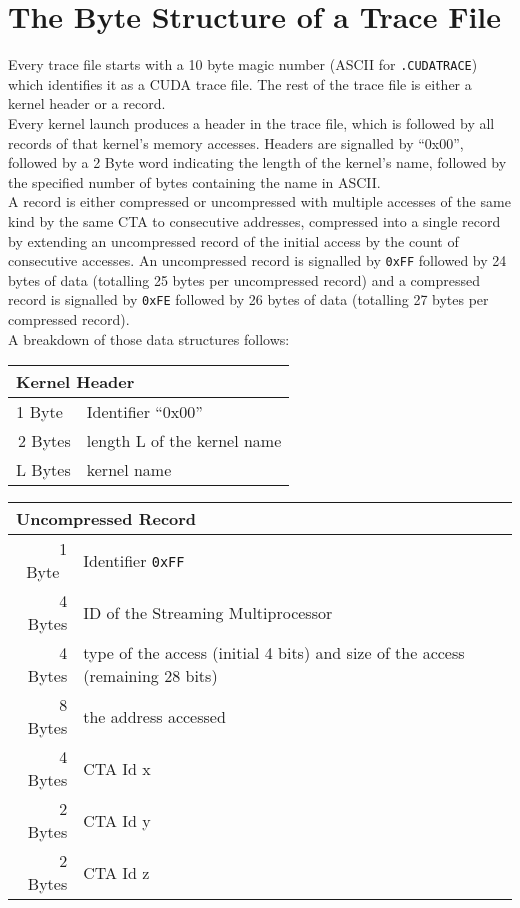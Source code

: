 \documentclass{scrartcl}
\begin{document}
\newpage

\section{The Byte Structure of a Trace File}
Every trace file starts with a 10 byte magic number (ASCII for \lstinline{.CUDATRACE}) which identifies it as a CUDA trace file. The rest of the trace file is either a kernel header or a record.\\
Every kernel launch produces a header in the trace file, which is followed by all records of that kernel’s memory accesses.
Headers are signalled by “0x00”, followed by a 2 Byte word indicating the length of the kernel’s name, followed by the specified number of bytes containing the name in ASCII.\\
A record is either compressed or uncompressed with multiple accesses of the same kind by the same CTA to consecutive addresses, compressed into a single record by extending an uncompressed record of the initial access by the count of consecutive accesses.
An uncompressed record is signalled by \lstinline{0xFF} followed by 24 bytes of data (totalling 25 bytes per uncompressed record) and a compressed record is signalled by \lstinline{0xFE} followed by 26 bytes of data (totalling 27 bytes per compressed record).\\
A breakdown of those data structures follows:

\bigskip

\begin{tabular}{r l}
\toprule
\multicolumn{2}{l}{\textbf{Kernel Header}} \\
\midrule
1 Byte~ & Identifier “0x00” \\
2 Bytes & length L of the kernel name \\
L Bytes & kernel name \\
\bottomrule
\end{tabular}

\bigskip

\begin{tabular}{r l}
\toprule
\multicolumn{2}{l}{\textbf{Uncompressed Record}} \\
\midrule
1 Byte~ & Identifier \lstinline[]$0xFF$ \\
4 Bytes & ID of the Streaming Multiprocessor \\
4 Bytes & type of the access (initial 4 bits) and size of the access (remaining 28 bits) \\
8 Bytes & the address accessed \\
4 Bytes & CTA Id x \\
2 Bytes & CTA Id y \\
2 Bytes & CTA Id z \\
\bottomrule
\end{tabular}
\end{document}
